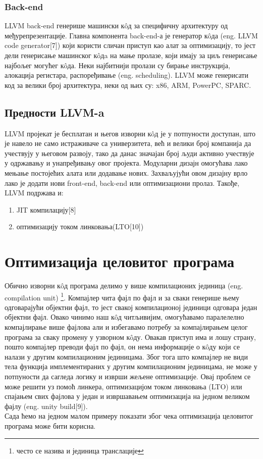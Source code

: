 \documentclass[12pt,oneside]{memoir}
\begin{document}
\subsection{Back-end} 
LLVM back-end генерише машински к\^{o}д за специфичну архитектуру од међурепрезентације. 
Главна компонента back-end-а је генератор к\^{o}да (eng. LLVM code generator[7]) који
користи сличан приступ као алат за оптимизацију, то јест дели генерисање машинског
к\^{o}дa на мање пролазе, који имају за циљ генерисање најбољег могућег к\^{o}да.
Неки најбитнији пролази су бирање инструкција, алокација регистара, распоређивање
(eng. scheduling).
LLVM може генерисати код за велики број архитектура, неки од њих су: x86, ARM,
PowerPC, SPARC.

\section{Предности LLVM-a}

LLVM пројекат је бесплатан и његов изворни к\^{o}д је у потпуности доступан, 
што је навело не само истраживаче са универзитета, већ и велики број компанија 
да учествују у његовом развоју, тако да данас значајан број људи активно 
учествује у одржавању и унапређивању овог пројекта.
Модуларни дизајн омогућава лако мењање постојећих алата или додавање нових.
Захваљујући овом дизајну врло лако је додати нови front-end, back-end или
оптимизациони пролаз.
Такође, LLVM подржава и:
\begin{enumerate}
\item JIT компилацију[8]
\item оптимизацију током линковања(LTO[10])
\end{enumerate}

\chapter{Оптимизација целовитог програма}

Обично изворни к\^{o}д програма делимо у више компилационих јединица (eng. compilation unit) \footnote{често се назива и јединица транслације}.
Компајлер чита фајл по фајл и за сваки генерише њему одговарајући објектни фајл,
то јест свакој компилационој јединици одговара један објектни фајл.
Овако чинимо наш к\^{o}д читљивијим, омогућавамо паралелелно компајлирање више 
фајлова али и избегавамо потребу за компајлирањем целог програма за сваку промену
у узворном к\^{o}ду.
Овакав приступ има и лошу страну, пошто компајлер преводи фајл по фајл, он нема 
информације о к\^{o}ду који се налази у другим компилационим јединицама.
Због тога што компајлер не види тела функција имплементираних у другим компилационим
јединицама, не може у потпуности да сагледа логику и изврши жељене оптимизације.
Овај проблем се може решити уз помоћ линкера,
оптимизацијом током линковања (LTO) или спајањем свих фајлова у један и извршавањем
оптимизација на једном великом фајлу (eng. unity build[9]).
\\
Сада ћемо на једном малом примеру показати због чека оптимизација целовитог програма 
може бити корисна.
\end{document}
